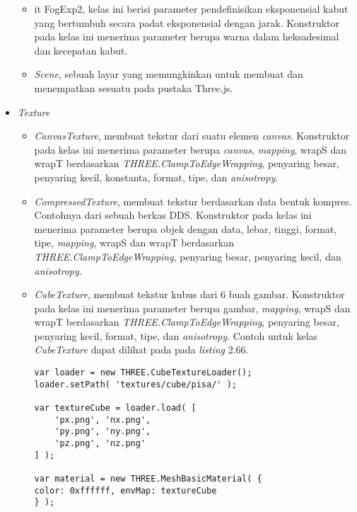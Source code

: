 \begin{itemize}
\begin{itemize}
	\item {it FogExp2}, kelas ini berisi parameter pendefinisikan eksponensial kabut yang bertumbuh secara padat eksponensial dengan jarak. Konstruktor pada kelas ini menerima parameter berupa warna dalam heksadesimal dan kecepatan kabut.
	
	\item {\it Scene}, sebuah layar yang memungkinkan untuk membuat dan menempatkan sesuatu pada pustaka Three.js. 
	\end{itemize}
	
\item \textit{Texture}
	\begin{itemize}
	\item{\it CanvasTexture}, membuat tekstur dari suatu elemen {\it canvas}. Konstruktor pada kelas ini menerima parameter berupa {\it canvas}, {\it mapping}, wrapS dan wrapT berdasarkan {\it THREE.ClampToEdgeWrapping}, penyaring besar, penyaring kecil, konstanta, format, tipe, dan {\it anisotropy}.
	\item{\it CompressedTexture}, membuat tekstur berdasarkan data bentuk kompres. Contohnya dari sebuah berkas DDS. Konstruktor pada kelas ini menerima parameter berupa objek dengan data, lebar, tinggi, format, tipe, {\it mapping}, wrapS dan wrapT berdasarkan {\it THREE.ClampToEdgeWrapping}, penyaring besar, penyaring kecil, dan {\it anisotropy}.
	\item{\it CubeTexture}, membuat tekstur kubus dari 6 buah gambar. Konstruktor pada kelas ini menerima parameter berupa gambar, {\it mapping},  wrapS dan wrapT berdasarkan {\it THREE.ClampToEdgeWrapping}, penyaring besar, penyaring kecil, format, tipe, dan {\it anisotropy}. Contoh untuk kelas {\it CubeTexture} dapat dilihat pada pada {\it listing} 2.66.
	
\begin{lstlisting}[caption={Contoh penggunaan kelas {\it CubeTexture}.},captionpos=b]
var loader = new THREE.CubeTextureLoader();
loader.setPath( 'textures/cube/pisa/' );

var textureCube = loader.load( [
	'px.png', 'nx.png',
	'py.png', 'ny.png',
	'pz.png', 'nz.png'
] );

var material = new THREE.MeshBasicMaterial( { 
color: 0xffffff, envMap: textureCube 
} );
\end{lstlisting}
	

\end{itemize}
\end{itemize}
